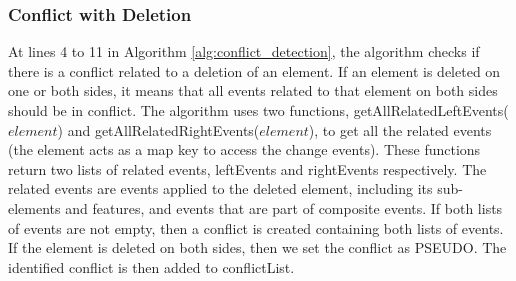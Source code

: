 \subsubsection{Conflict with Deletion} 
\label{sec:delete_conflict} 
At lines 4 to 11 in Algorithm \ref{alg:conflict_detection}, the algorithm checks if there is a conflict related to a deletion of an element.
If an element is deleted on one or both sides, it means that all events related to that element on both sides should be in conflict.
The algorithm uses two functions, \textsf{getAllRelatedLeftEvents($element$)} and \textsf{getAllRelatedRightEvents($element$)}, to get all the related events (the element acts as a map key to access the change events). These functions return two lists of related events,
\textsf{leftEvents} and \textsf{rightEvents} respectively. The related events are events applied to the deleted element, including its sub-elements and features,
and events that are part of composite events. If both lists of events are not empty, then a conflict is created containing both lists of events.
If the element is deleted on both sides, then we set the conflict as \textsf{PSEUDO}. The identified conflict is then added to \textsf{conflictList}.

